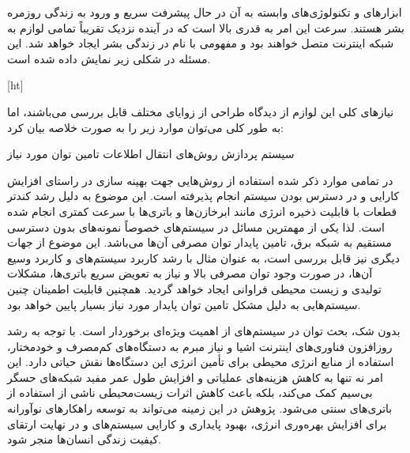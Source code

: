 
\label{فصل۱:مقدمه}


ابزارهای  و تکنولوژی‌های وابسته به آن در حال پیشرفت سریع و ورود به زندگی روزمره بشر هستند. سرعت این امر به قدری بالا است که در آینده نزدیک تقریباً تمامی لوازم به شبکه اینترنت متصل خواهند بود و مفهومی با نام  در زندگی بشر ایجاد خواهد شد. این مسئله در شکلی زیر نمایش داده شده است.

[ht]



نیازهای کلی این لوازم از دیدگاه طراحی از زوایای مختلف قابل بررسی می‌باشند، اما به طور کلی می‌توان موارد زیر را به صورت خلاصه بیان کرد:


 سیستم پردازش
 روش‌های انتقال اطلاعات
 تامین توان مورد نیاز



در تمامی موارد ذکر شده استفاده از روش‌هایی جهت بهینه سازی در راستای افزایش کارایی و در دسترس بودن سیستم انجام پذیرفته است. این موضوع به دلیل رشد کندتر قطعات با قابلیت ذخیره انرژی مانند ابرخازن‌ها و باتری‌ها با سرعت کمتری انجام شده است. لذا یکی از مهمترین مسائل در سیستم‌های  خصوصاً نمونه‌های بدون دسترسی مستقیم به شبکه برق، تامین پایدار توان مصرفی آن‌ها می‌باشد. این موضوع از جهات دیگری نیز قابل بررسی است، به عنوان مثال با رشد کاربرد سیستم‌های  و کاربرد وسیع آن‌ها، در صورت وجود توان مصرفی بالا و نیاز به تعویض سریع باتری‌ها، مشکلات تولیدی و زیست محیطی فراوانی ایجاد خواهد گردید. همچنین قابلیت اطمینان چنین سیستم‌هایی به دلیل مشکل تامین توان پایدار مورد نیاز بسیار پایین خواهد بود.



بدون شک، بحث توان در سیستم‌های  از اهمیت ویژه‌ای برخوردار است. با توجه به رشد روزافزون فناوری‌های اینترنت اشیا و نیاز مبرم به دستگاه‌های کم‌مصرف و خودمختار، استفاده از منابع انرژی محیطی برای تأمین انرژی این دستگاه‌ها نقش حیاتی دارد. این امر نه تنها به کاهش هزینه‌های عملیاتی و افزایش طول عمر مفید شبکه‌های حسگر بی‌سیم کمک می‌کند، بلکه باعث کاهش اثرات زیست‌محیطی ناشی از استفاده از باتری‌های سنتی می‌شود. پژوهش در این زمینه می‌تواند به توسعه راهکارهای نوآورانه برای افزایش بهره‌وری انرژی، بهبود پایداری و کارایی سیستم‌های  و در نهایت ارتقای کیفیت زندگی انسان‌ها منجر شود.



